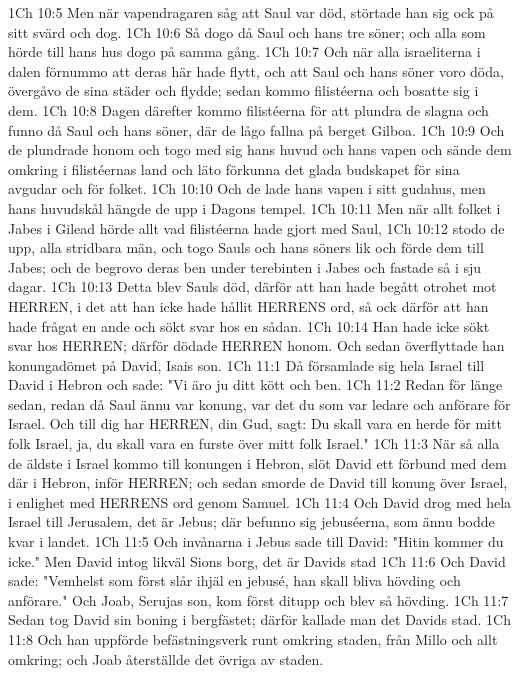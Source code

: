 1Ch 10:5  Men när vapendragaren såg att Saul var död, störtade han sig ock på sitt svärd och dog.
1Ch 10:6  Så dogo då Saul och hans tre söner; och alla som hörde till hans hus dogo på samma gång.
1Ch 10:7  Och när alla israeliterna i dalen förnummo att deras här hade flytt, och att Saul och hans söner voro döda, övergåvo de sina städer och flydde; sedan kommo filistéerna och bosatte sig i dem.
1Ch 10:8  Dagen därefter kommo filistéerna för att plundra de slagna och funno då Saul och hans söner, där de lågo fallna på berget Gilboa.
1Ch 10:9  Och de plundrade honom och togo med sig hans huvud och hans vapen och sände dem omkring i filistéernas land och läto förkunna det glada budskapet för sina avgudar och för folket.
1Ch 10:10  Och de lade hans vapen i sitt gudahus, men hans huvudskål hängde de upp i Dagons tempel.
1Ch 10:11  Men när allt folket i Jabes i Gilead hörde allt vad filistéerna hade gjort med Saul,
1Ch 10:12  stodo de upp, alla stridbara män, och togo Sauls och hans söners lik och förde dem till Jabes; och de begrovo deras ben under terebinten i Jabes och fastade så i sju dagar.
1Ch 10:13  Detta blev Sauls död, därför att han hade begått otrohet mot HERREN, i det att han icke hade hållit HERRENS ord, så ock därför att han hade frågat en ande och sökt svar hos en sådan.
1Ch 10:14  Han hade icke sökt svar hos HERREN; därför dödade HERREN honom. Och sedan överflyttade han konungadömet på David, Isais son.
1Ch 11:1  Då församlade sig hela Israel till David i Hebron och sade: "Vi äro ju ditt kött och ben.
1Ch 11:2  Redan för länge sedan, redan då Saul ännu var konung, var det du som var ledare och anförare för Israel. Och till dig har HERREN, din Gud, sagt: Du skall vara en herde för mitt folk Israel, ja, du skall vara en furste över mitt folk Israel."
1Ch 11:3  När så alla de äldste i Israel kommo till konungen i Hebron, slöt David ett förbund med dem där i Hebron, inför HERREN; och sedan smorde de David till konung över Israel, i enlighet med HERRENS ord genom Samuel.
1Ch 11:4  Och David drog med hela Israel till Jerusalem, det är Jebus; där befunno sig jebuséerna, som ännu bodde kvar i landet.
1Ch 11:5  Och invånarna i Jebus sade till David: "Hitin kommer du icke." Men David intog likväl Sions borg, det är Davids stad
1Ch 11:6  Och David sade: "Vemhelst som först slår ihjäl en jebusé, han skall bliva hövding och anförare." Och Joab, Serujas son, kom först ditupp och blev så hövding.
1Ch 11:7  Sedan tog David sin boning i bergfästet; därför kallade man det Davids stad.
1Ch 11:8  Och han uppförde befästningsverk runt omkring staden, från Millo och allt omkring; och Joab återställde det övriga av staden.
